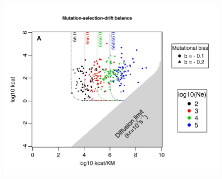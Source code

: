 \begin{figure}[h!]
\begin{center}
\begin{minipage}[c]{0.575\textwidth}
    \includegraphics[scale=0.6,trim=0cm 0cm 0cm 0cm,clip]{pics/SM-Enzymes/Evo_Results_Crowding.jpeg}

\end{minipage}
\end{center}
\end{figure}
